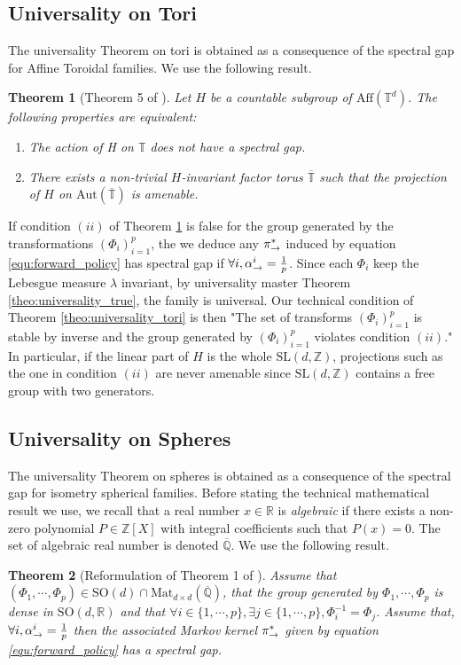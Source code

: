 \documentclass{article}
\theoremstyle{plain}
\newtheorem{theorem}{Theorem}[section]
\theoremstyle{definition}
\theoremstyle{remark}
\theoremstyle{fact}
\begin{document}
\subsection{Universality on Tori}
The universality Theorem on tori is obtained as a consequence of the spectral gap for Affine Toroidal families. We use the following result.
\begin{theorem}[Theorem 5 of \cite{bekka2015spectral}  ]
\label{theo:spectral_gap_tori}
    Let $H$ be a countable subgroup of $\mathrm{Aff}(\mathbb T^d)$. The following properties are equivalent:
    \begin{enumerate}
        \item[(i)]  The action of H on $\mathbb{T}$ does not have a spectral gap.
\item[(ii)] There exists a non-trivial $H$-invariant factor torus $\overline{\mathbb T}$ such that the projection of $H$ on $\mathrm{Aut}(\overline {\mathbb T})$ is amenable.
    \end{enumerate}
\end{theorem}
If condition $(ii)$ of Theorem \ref{theo:spectral_gap_tori} is false for the group generated by the transformations $(\Phi_i)_{i=1}^p$, the we deduce any $\pi_{\rightarrow}^*$  induced by equation \eqref{equ:forward_policy} has spectral gap if $\forall i,\alpha_{\rightarrow}^i=\frac{1}{p}$.
Since each $\Phi_i$ keep the Lebesgue measure $\lambda$ invariant,  by universality master Theorem \ref{theo:universality_true}, the family is universal. Our technical condition of Theorem \ref{theo:universality_tori} is then 
"The set of transforms $(\Phi_i)_{i=1}^p$ is stable by inverse and the group generated by $(\Phi_i)_{i=1}^p$ violates condition $(ii)$."
In particular, if the linear part of $H$ is the whole $\mathrm{SL}(d,\mathbb Z)$, projections such as the one in condition $(ii)$ are never amenable since  $\mathrm{SL}(d,\mathbb Z)$ contains a free group with two generators. 




\subsection{Universality on Spheres}
The universality Theorem on spheres is obtained as a consequence of the spectral gap for isometry spherical families.
Before stating the technical mathematical result we use, we recall that a real number $x\in \mathbb R$ is {\it algebraic} if there exists a non-zero polynomial $P\in \mathbb Z[X]$ with integral coefficients such that $P(x)=0$. The set of algebraic real number is denoted $\overline {\mathbb Q}$.
We use the following result.
\begin{theorem}[Reformulation of Theorem 1 of \cite{bourgain2012spectral}  ]
\label{theo:spectral_gap_sphere} 
 Assume that $(\Phi_1,\cdots, \Phi_p) \in \mathrm{SO}(d)\cap\mathrm{Mat}_{d\times d}(\overline {\mathbb Q})$, that the group generated by $\Phi_1,\cdots,\Phi_p$ is dense in $\mathrm{SO}(d,\mathbb R)$ and that $\forall i\in \{1,\cdots,p\}, \exists j \in \{1,\cdots,p\}, \Phi_i^{-1}=\Phi_j$. 
 Assume that, $\forall i, \alpha_{\rightarrow}^i = \frac{1}{p}$ then the associated Markov kernel $\pi_{\rightarrow}^*$ given by equation \eqref{equ:forward_policy} has a spectral gap.
\end{theorem}
\end{document}
